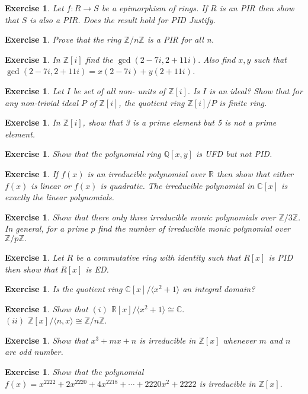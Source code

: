 \documentclass[11pt]{amsart}
\newtheorem{ex}[theorem]{Exercise}
\newcommand{\QQ}{\mathbb Q}
\newcommand{\ZZ}{\mathbb Z}
\newcommand{\CC}{\mathbb C}
\newcommand{\RR}{\mathbb R}
\newcommand{\gen}[1]{\langle#1\rangle}
\begin{document}
\begin{ex}
Let $f:R\to S$ be a epimorphism of rings. If $R$ is an PIR then show that $S$ is also a PIR. Does the result hold for PID Justify.
\end{ex}
\begin{ex}
Prove that the ring ${\ZZ}/n{\ZZ}$ is a PIR for all n.
\end{ex}
\begin{ex}
In ${\ZZ}[i]$ find the $\gcd (2-7i,2+11i).$ Also find $x,y$ such that $\gcd (2-7i,2+11i)=x(2-7i)+y(2+11i)$.
\end{ex}
\begin{ex}
Let $I$ be set of all non- units of ${\ZZ}[i].$ Is $I$ is an ideal? Show that for any non-trivial ideal $P$ of ${\ZZ}[i]$, the quotient ring ${\ZZ}[i]/P$ is finite ring.
\end{ex}
\begin{ex}
In ${\ZZ}[i]$, show that 3 is a prime element but 5 is not a prime element.
\end{ex}
\begin{ex}
Show that the polynomial ring ${\QQ}[x,y]$ is UFD but not PID.
\end{ex}
\begin{ex}
If $f(x)$ is an irreducible polynomial over ${\RR}$ then show that either $f(x)$ is linear or $f(x)$ is quadratic. The irreducible polynomial in ${\CC}[x]$ is exactly the linear polynomials.
\end{ex}
\begin{ex}
Show that there only three irreducible monic polynomials over ${\ZZ}/3{\ZZ}.$ In general, for a prime $p$ find the number of irreducible monic polynomial over ${\ZZ}/p{\ZZ}.$
\end{ex}
\begin{ex}
Let $R$ be a commutative ring with identity such that $R[x]$ is PID then show that $R[x]$ is ED.
\end{ex}
\begin{ex}
Is the quotient ring ${\CC}[x]/\gen{x^2+1}$ an integral domain?
\end{ex}
\begin{ex}
Show that $(i)$ ${\RR}[x]/\gen{x^2+1}\cong {\CC}.$\\
$(ii)$ ${\ZZ}[x]/\gen{n,x}\cong {\ZZ}/n{\ZZ}.$
\end{ex}
\begin{ex}
Show that $x^3+mx+n$ is irreducible in ${\ZZ}[x]$ whenever $m$ and $n$ are odd number.
\end{ex}
\begin{ex}
Show that the polynomial $f(x)=x^{2222}+2x^{2220}+4x^{2218}+\cdots +2220x^2+2222$ is irreducible in ${\ZZ}[x].$
\end{ex}
\end{document}
